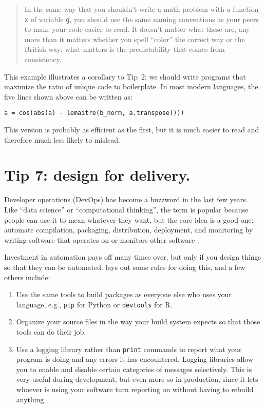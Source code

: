 \documentclass[10pt,letterpaper]{article}
\begin{document}
\begin{quotation}
  In the same way that you shouldn't write a math problem with a function \texttt{x} of variable \texttt{g},
  you should use the same naming conventions as your peers
  to make your code easier to read.
  It doesn't matter what these are,
  any more than it matters whether you spell ``color'' the correct way or the British way;
  what matters is the predictability that comes from consistency.
\end{quotation}

This example illustrates a corollary to Tip~2:
we should write programs that maximize the ratio of unique code to boilerplate.
In most modern languages,
the five lines shown above can be written as:

\begin{lstlisting}
a = cos(abs(a) - lemaitre(b_norm, a.transpose()))
\end{lstlisting}

\noindent
This version is probably as efficient as the first,
but it is much easier to read and therefore much less likely to mislead.

\section*{Tip 7: design for delivery.}

Developer operations (DevOps) has become a buzzword in the last few years.
Like ``data science'' or ``computational thinking'',
the term is popular because people can use it to mean whatever they want,
but the core idea is a good one:
automate compilation, packaging, distribution, deployment, and monitoring
by writing software that operates on or monitors other software \cite{Kim2016,Forsgren2018}.

Investment in automation pays off many times over,
but only if you design things so that they can be automated.
\cite{Taschuk2017} lays out some rules for doing this,
and a few others include:

\begin{enumerate}

\item
  Use the same tools to build packages as everyone else who uses your language,
  e.g., \texttt{pip} for Python or \texttt{devtools} for R.

\item
  Organize your source files in the way your build system expects
  so that those tools can do their job.

\item
  Use a logging library rather than \texttt{print} commands
  to report what your program is doing and any errors it has encountered.
  Logging libraries allow you to enable and disable certain categories of messages selectively.
  This is very useful during development,
  but even more so in production,
  since it lets whoever is using your software turn reporting on
  without having to rebuild anything.

\end{enumerate}
\end{document}

